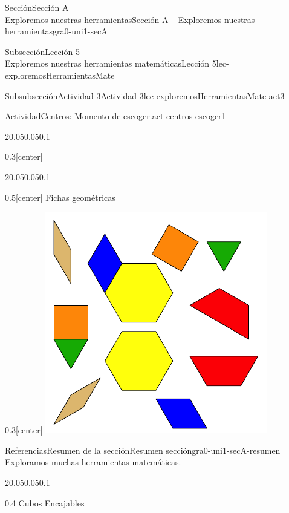 \begin{sectionptx}{Sección}{{\Large Sección A\\}Exploremos nuestras herramientas}{}{Sección A -~Exploremos nuestras herramientas}{}{}{gra0-uni1-secA}
\begin{subsectionptx}{Subsección}{{\normalsize Lección 5\\[-0.05cm]}Exploremos nuestras herramientas matemáticas}{}{Lección 5}{}{}{lec-exploremosHerramientasMate}
\begin{subsubsectionptx}{Subsubsección}{Actividad 3}{}{Actividad 3}{}{}{lec-exploremosHerramientasMate-act3}
\begin{activity}{Actividad}{Centros: Momento de escoger.}{act-centros-escoger1}
\begin{sidebyside}{2}{0.05}{0.05}{0.1}
\begin{sbspanel}{0.3}[center]
\end{sbspanel}%
\end{sidebyside}%
\begin{sidebyside}{2}{0.05}{0.05}{0.1}%
\begin{sbspanel}{0.5}[center]%
Fichas geométricas%
\end{sbspanel}%
\begin{sbspanel}{0.3}[center]%
\includegraphics[max width=\linewidth, center]{external/svg-source/tikz-file-147344.pdf}
\end{sbspanel}%
\end{sidebyside}%
\end{activity}%
\end{subsubsectionptx}
\end{subsectionptx}
%
%
\typeout{************************************************}
\typeout{************************************************}
%
\begin{references-subsection}{Referencias}{Resumen de la sección}{}{Resumen sección}{}{}{gra0-uni1-secA-resumen}
Exploramos muchas herramientas matemáticas.%
\begin{sidebyside}{2}{0.05}{0.05}{0.1}%
\begin{sbspanel}{0.4}%
Cubos Encajables%
\par

\end{sbspanel}
\end{sidebyside}
\end{references-subsection}
\end{sectionptx}
